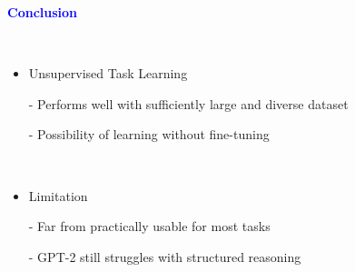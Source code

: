\documentclass[professionalfont]{beamer}
\begin{document}
\begin{frame}

\begin{center}
    { \textbf{\textcolor{blue}{ {\fontsize{12}{14}\selectfont Conclusion} }} }
\end{center}
\\[0.3cm]

{\fontsize{10}{14}\selectfont 
\begin{itemize}
    \item Unsupervised Task Learning

    - Performs well with sufficiently large and diverse dataset
    
    - Possibility of learning without fine-tuning

    \\[0.3cm]

    \item Limitation

    - Far from practically usable for most tasks

    - GPT-2 still struggles with structured reasoning
\end{itemize}
}

\end{frame}
\end{document}
